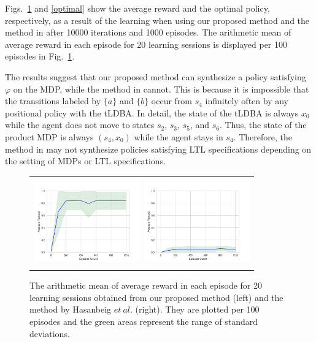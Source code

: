 \documentclass[letterpaper, 10 pt, conference]{ieeeconf}  %
\begin{document}
Figs.\ \ref{result} and \ref{optimal} show the average reward and the optimal policy, respectively, as a result of the learning when using our proposed method and the method in \cite{HAK2019} after 10000 iterations and 1000 episodes. The arithmetic mean of average reward in each episode for 20 learning sessions is displayed per 100 episodes in Fig.\ \ref{result}.

The results suggest that our proposed method can synthesize a policy satisfying $\varphi$ on the MDP, while the method in \cite{HAK2019} cannot. This is because it is impossible that the transitions labeled by $\{ a \}$ and $\{ b \}$ occur from $s_4$ infinitely often by any positional policy with the tLDBA. In detail, the state of the tLDBA is always $x_0$ while the agent does not move to states $s_2$, $s_3$, $s_5$, and $s_6$. Thus, the state of the product MDP is always $(s_4, x_0)$ while the agent stays in $s_4$. Therefore, the method in \cite{HAK2019} may not synthesize policies satisfying LTL specifications depending on the setting of MDPs or LTL specifications.

\begin{figure}[tbp]
 \centering
 \begin{tabular}{c}
  \begin{minipage}{0.5\hsize}
     \centering
     \includegraphics[bb=0 0 461 346, height = 3.8cm, width=4.6cm]{ep_1000_it_10000_MDP3_gamma_095_re2_ini22_nts_c095_20times.png}
 \end{minipage}

 \begin{minipage}{0.5\hsize}
   \centering
   \includegraphics[bb=0 0 461 346, height = 3.8cm, width=4.6cm]{ep_1000_it_10000_MDP3_gamma_095_nts_c095_abate_20times.png}
 \end{minipage}
\end{tabular}
 \caption{The arithmetic mean of average reward in each episode for 20 learning sessions obtained from our proposed method (left) and the method by Hasanbeig $et\ al.$\cite{HAK2019} (right). They are plotted per 100 episodes and the green areas represent the range of standard deviations.}
 \label{result}
\end{figure}
\end{document}
